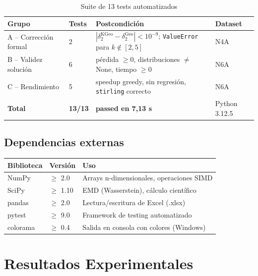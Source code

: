 \documentclass[12pt,letterpaper]{article}
\theoremstyle{definition}
\theoremstyle{remark}
\begin{document}
\begin{table}[ht]
\centering
\caption{Suite de 13 tests automatizados}
\label{tab:tests}
\begin{tabular}{@{}l l l l@{}}
\toprule
\textbf{Grupo} & \textbf{Tests} & \textbf{Postcondición} & \textbf{Dataset} \\
\midrule
A -- Corrección formal  & 2 &
  $|\delta_2^{\mathrm{KGeo}} - \delta_2^{\mathrm{Geo}}| < 10^{-9}$;
  \texttt{ValueError} para $k \notin [2,5]$ & N4A \\
B -- Validez solución   & 6 &
  pérdida $\geq 0$, distribuciones $\neq$ None, tiempo $\geq 0$ & N6A \\
C -- Rendimiento        & 5 &
  speedup greedy, sin regresión, \texttt{stirling} correcto & N6A \\
\midrule
\textbf{Total} & \textbf{13/13} & \textbf{passed en 7{,}13 s} & Python 3.12.5 \\
\bottomrule
\end{tabular}
\end{table}

\subsection{Dependencias externas}

\begin{center}
\begin{tabular}{@{}l l l@{}}
\toprule
\textbf{Biblioteca} & \textbf{Versión} & \textbf{Uso} \\
\midrule
NumPy   & $\geq$ 2.0  & Arrays n-dimensionales, operaciones SIMD \\
SciPy   & $\geq$ 1.10 & EMD (Wasserstein), cálculo científico \\
pandas  & $\geq$ 2.0  & Lectura/escritura de Excel (.xlsx) \\
pytest  & $\geq$ 9.0  & Framework de testing automatizado \\
colorama & $\geq$ 0.4 & Salida en consola con colores (Windows) \\
\bottomrule
\end{tabular}
\end{center}

\section{Resultados Experimentales}
\label{sec:resultados}
\end{document}
